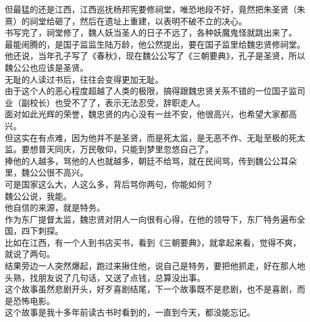 \begin{multicols}{\theparacolNo}
但最猛的还是江西，江西巡抚杨邦宪要修祠堂，唯恐地段不好，竟然把朱圣贤（朱熹）的祠堂给砸了，然后在遗址上重建，以表明不破不立的决心。\\

书写完了，祠堂修了，魏人妖当圣人的日子不远了，各种妖魔鬼怪就跳出来了。\\

最能闹腾的，是国子监监生陆万龄，他公然提出，要在国子监里给魏忠贤修祠堂。他还说，当年孔子写了《春秋》，现在魏公公写了《三朝要典》，孔子是圣贤，所以魏公公也应该是圣贤。\\

无耻的人读过书后，往往会变得更加无耻。\\

由于这个人的恶心程度超越了人类的极限，搞得跟魏忠贤关系不错的一位国子监司业（副校长）也受不了了，表示无法忍受，辞职走人。\\

面对如此光辉的荣誉，魏忠贤的内心没有一丝不安，他很高兴，也希望大家都高兴。\\

但这实在有点难，因为他并不是圣贤，而是死太监，是无恶不作、无耻至极的死太监。要想普天同庆，万民敬仰，只能到梦里忽悠自己了。\\

捧他的人越多，骂他的人也就越多，朝廷不给骂，就在民间骂，传到魏公公耳朵里，魏公公很不高兴。\\

可是国家这么大，人这么多，背后骂你两句，你能如何？\\

魏公公说，我能。\\

他自信的来源，就是特务。\\

作为东厂提督太监，魏忠贤对阴人一向很有心得，在他的领导下，东厂特务遍布全国，四下刺探。\\

比如在江西，有一个人到书店买书，看到《三朝要典》，就拿起来看，觉得不爽，就说了两句。\\

结果旁边一人突然爆起，跑过来揪住他，说自己是特务，要把他抓走，好在那人地头熟，找朋友说了几句话，又送了点钱，总算没出事。\\

这个故事虽然悲剧开头，好歹喜剧结尾，下一个故事既不是悲剧，也不是喜剧，而是恐怖电影。\\

这个故事是我十多年前读古书时看到的，一直到今天，都没能忘记。\\


\end{multicols}

